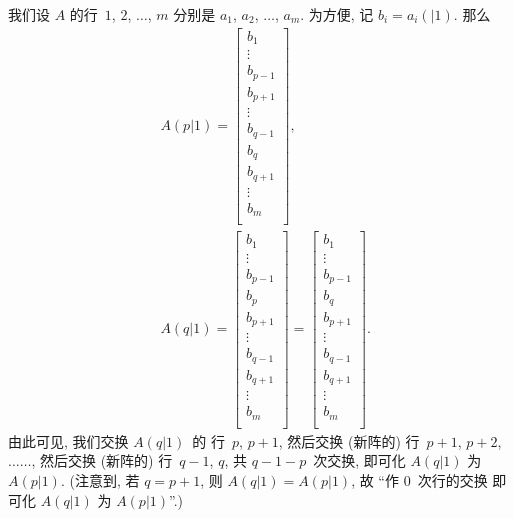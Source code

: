 \documentclass[%
    UTF8,%
    fontset=none,%
    punct=kaiming,%
    zihao=-4,%
    a4paper,%
    oneside,%
]{ctexbook}
\begin{document}
我们设 \(A\) 的行~\(1\), \(2\), \(\dots\), \(m\)
分别是 \(a_1\), \(a_2\), \(\dots\), \(a_m\).
为方便, 记 \(b_i = a_i (|1)\).
那么
\begin{align*}
     & A(p|1) =
    \begin{bmatrix}
        b_1     \\
        \vdots  \\
        b_{p-1} \\
        b_{p+1} \\
        \vdots  \\
        b_{q-1} \\
        b_q     \\
        b_{q+1} \\
        \vdots  \\
        b_m     \\
    \end{bmatrix},
    \\
     & A(q|1) =
    \begin{bmatrix}
        b_1     \\
        \vdots  \\
        b_{p-1} \\
        b_p     \\
        b_{p+1} \\
        \vdots  \\
        b_{q-1} \\
        b_{q+1} \\
        \vdots  \\
        b_m     \\
    \end{bmatrix}
    =
    \begin{bmatrix}
        b_1     \\
        \vdots  \\
        b_{p-1} \\
        b_q     \\
        b_{p+1} \\
        \vdots  \\
        b_{q-1} \\
        b_{q+1} \\
        \vdots  \\
        b_m     \\
    \end{bmatrix}.
\end{align*}
由此可见,
我们交换 \(A(q|1)\)~的%
行~\(p\), \(p+1\),
然后交换 (新阵的) 行~\(p+1\), \(p+2\),
\(\dots\dots\),
然后交换 (新阵的) 行~\(q-1\), \(q\),
共 \(q - 1 - p\)~次交换,
即可化 \(A(q|1)\) 为 \(A(p|1)\).
(注意到, 若 \(q = p + 1\),
则 \(A(q|1) = A(p|1)\),
故 ``作 \(0\)~次行的交换%
即可化 \(A(q|1)\) 为 \(A(p|1)\)''.)
\end{document}
